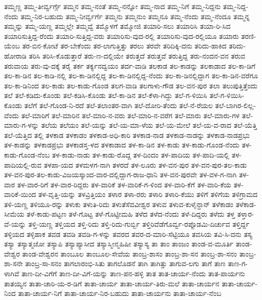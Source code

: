 ತಮ್ಮಣ್ಣ
ತಮ್ಮ-ತೀರ್ವ್ವರ್ಗ್ಗೆ
ತಮ್ಮನ
ತಮ್ಮ-ನಂತೆ
ತಮ್ಮ-ನನ್ನೋ
ತಮ್ಮ-ನಾದ
ತಮ್ಮ-ನಿಗೆ
ತಮ್ಮ-ನಿದ್ದನು
ತಮ್ಮ-ನಿದ್ದ-ನೆಂದು
ತಮ್ಮ-ನಿರ-ಬಹುದು
ತಮ್ಮ-ನೀರ್ವ್ವರ್ಗೆ
ತಮ್ಮನು
ತಮ್ಮನುಂ
ತಮ್ಮನೂ
ತಮ್ಮ-ನೆಂದು
ತಮ್ಮ-ನೆಂದೂ
ತಮ್ಮನ್ನ
ತಮ್ಮನ್ನು
ತಮ್ಮ-ಯಣ್ಣ
ತಮ್ಮಲ್ಲೇ
ತಮ್ಮವ್ವೆ
ತಮ್ಮೊಳಗೆ
ತಮ್ಮೋಜಿ
ತಯಾರಿ-ಸಲು
ತಯಾರಿಸಿ
ತಯಾ-ರಿ-ಸಿದ
ತಯಾರಿಸುತ್ತಿದ್ದ-ರೆಂದು
ತಯಾರಿ-ಸುತ್ತಿದ್ದ-ವರು
ತಯಾರಿಸು-ವುದ-ರಲ್ಲಿ
ತಯಾರಿಸು-ವುದ-ರಲ್ಲಿಯೂ
ತಯಾರು
ತರಣಿ-ಯೆಂಬ
ತರ-ಬಿನ-ಕೋಟೆ
ತರ-ಬೇಕೆಂದು
ತರ-ಲಾಗುತ್ತಿತ್ತು
ತರಲು
ತರವೇ
ತರಿದಿಕ್ಕಿ-ದನು
ತರಿದು-ಹಾಕಿದ
ತರಿದು-ಹೋರಾಡಿ
ತರಿಸಿ
ತರಿಸಿ-ಕೊಡುತ್ತಾರೆ
ತರು-ಣ-ದಲ್ಲಿಯೇ
ತರುತ್ತದೆ
ತರುತ್ತವೆ
ತರುತ್ತಿದ್ದ
ತರು-ನಂದನ-ವನ
ತರುವ
ತರುವಾಯ
ತರು-ವು-ದಕ್ಕೆ
ತರೈ
ತರ್ಕ
ತರ್ಕ್ಯನದ್ವಯಂ
ತರ್ದ-ವಾಡಿ
ತಲಕಾಡ
ತಲ-ಕಾಡನ್ನು
ತಲಕಾಡಾದ
ತಲ-ಕಾ-ಡಿಗೆ
ತಲ-ಕಾ-ಡಿನ
ತಲ-ಕಾಡಿ-ನಲ್ಲಿ
ತಲ-ಕಾ-ಡಿನಲ್ಲಿದ್ದ
ತಲ-ಕಾ-ಡಿನಲ್ಲಿದ್ದ-ನೆಂದು
ತಲ-ಕಾ-ಡಿನಲ್ಲಿದ್ದಾಗ
ತಲ-ಕಾ-ಡಿನ-ವರೆಗೂ
ತಲ-ಕಾ-ಡಿನಿಂದ
ತಲ-ಕಾಡು
ತಲ-ಕಾಡು-ಗೊಂಡ
ತಲಗ-ವಾಡಿ
ತಲಗಾಳು-ಗೌಡ
ತಲ-ವನ-ಪುರ
ತಲಾ
ತಲುಪುತ್ತಿತ್ತೆಂದು
ತಲೆ
ತಲೆ-ಕಡಿದು-ಕೊಂಡು
ತಲೆ-ಕಡಿಸಿ-ಕೊಂಡು
ತಲೆ-ಕಾ-ಡಿನ
ತಲೆ-ಕೆಳಾ-ಗಿದ್ದು
ತಲೆ-ಗ-ಳಿಯಿಸಿ
ತಲೆ-ಗ-ಳಿಯಿಸಿ-ಕೊಂಡು
ತಲೆಗೆ
ತಲೆ-ಗೊಂಡ-ನಿ-ರದೆ
ತಲೆ-ತಲಾಂತರ-ವಾಗಿ
ತಲೆ-ದೋರಿ-ತೆಂದು
ತಲೆ-ನೆ-ರೆಯಲ
ತಲೆ-ಬಾಗಿರ-ಲಿಲ್ಲ-ವೆಂದು
ತಲೆ-ಮಾರಿಗೆ
ತಲೆ-ಮಾರಿನ
ತಲೆ-ಮಾರಿ-ನ-ವರು
ತಲೆ-ಮಾರಿ-ನ-ವರೆಗ
ತಲೆ-ಮಾರು
ತಲೆ-ಮಾರು-ಗಳ
ತಲೆ-ಮಾರು-ಗ-ಳನ್ನು
ತಲೆಯ
ತಲೆಯಂ
ತಲೆ-ಯನ್ನು
ತಲೆ-ಯ-ಮಾ-ಳೆಯ
ತಲೆ-ಯ-ಮೇಲೆ
ತಲೆ-ಯ-ವ-ರಾದ
ತಲೆ-ಯೆತ್ತಿ
ತಲೆ-ಯೆತ್ತಿದ
ತಲ್ಲಿ
ತಳಕಾಡ
ತಳಕಾಡಂ
ತಳಕಾಡ-ಅಧಿ-ಕಾರಿ
ತಳಕಾಡ-ನಾಡ
ತಳಕಾಡ-ನಾಡನ್ನು
ತಳಕಾಡ-ನಾಡಪ್ರಭು
ತಳ-ಕಾಡನ್ನು
ತಳಕಾಡಪ್ರಭು
ತಳಕಾಡಸ್ತ-ಳದ
ತಳಕಾಡಾದ
ತಳ-ಕಾ-ಡಿನ
ತಳ-ಕಾಡು
ತಳ-ಕಾಡು-ಗೊಂಡ-ನೆಂದು
ತಳ-ಕಾಡು-ಗೊಂಡ-ನೆಂಬ
ತಳ-ಕಾಡು-ನಾಡು
ತಳ-ಕಾಡು-ರೊದ್ದ
ತಳ-ದಿಂದಂ
ತಳ-ಪಾದಿಯ
ತಳ-ಪಾದಿ-ಯಲ್ಲಿ
ತಳ-ಪಾದಿಯಲ್ಲಿ-ರುವ
ತಳಪಾ-ಯದ
ತಳಮಳಗ-ನಾಗಿ
ತಳರದೆ
ತಳ-ಲೂರು
ತಳ-ವನ-ಪುರ
ತಳ-ವನ-ಪುರ-ತಲ-ಕಾಡು
ತಳ-ವನ-ಪುರ-ತಲ-ಕಾಡು-ವಿಜಯಸ್ಕಾಂದ-ವಾರ-ದಲ್ಲಿದ್ದಾಗ-ರಾಜ-ಧಾನಿ
ತಳ-ವನ-ಪುರವೇ
ತಳ-ವಳ-ಗ-ನಾಗಿ
ತಳ-ವಾರ
ತಳ-ವಾರ-ರಿಗೆ
ತಳ-ವಾರ-ರಿದ್ದರು
ತಳ-ವಾರಿಕೆ
ತಳ-ವಾರಿಕೆ-ಗ-ಳಿಂದ
ತಳ-ವಾರಿ-ಕೆಗೆ
ತಳ-ವಾರಿ-ಕೆಯ
ತಳ-ವಾರಿಕೆ-ಯಿಂದ
ತಳ-ವೃತ್ತಿ-ಯನ್ನು
ತಳವ್ರಿತ್ತಿಯಂ
ತಳಾರ
ತಳಾ-ರರು
ತಳಾರಿ
ತಳಾರಿ-ಕೆಯು
ತಳಿಗೆ
ತಳಿಗೆಯ
ತಳಿಗ್ರಾಮದ
ತಳಿ-ಯಣ್ಣ
ತಳಿಯೂ-ರನ್ನು
ತಳುಕು
ತಳುತಿ-ರಿದು
ತಳುತೆಸೆವವೀಶ್ವರ
ತಳುವ
ತಳುವ-ಕುಳೈನ್ದಾನ್
ತಳೆಕಾಡಂ
ತಳೆಕಾಡ-ಸೀಮೆಯ
ತಳೆ-ಕಾಡು-ಪಟ್ಟಣ
ತಳೆ-ಗೊಟ್ಟ
ತಳೆ-ಗೊಟ್ಟೀಮಹಿ
ತಳೆದ
ತಳೆದ-ನೆಂದು
ತಳೆ-ದಿದ್ದರು
ತಳೆದು
ತಳ್ತ
ತಳ್ತಾರ-ವೆ-ಯನ್ನು
ತಳ್ತಿ-ಯಣ್ಣ
ತಳ್ತಿಯದ
ತಳ್ತಿ-ರಿದು
ತಳ್ತಿ-ರಿದು-ಗುರ್ಬ್ಬಿ
ತಳ್ತಿರಿವೆಡೆಗೊರ್ವ್ವ-ರಪ್ಪೊಡಮಿ-ದಿರ್ಚುವ
ತಳ್ತಿರ್ದ್ದ
ತಳ್ಳಿಯದ
ತಳ್ಳಿಹಾಕ
ತವಡ
ತವಡಿ
ತವಡಿ-ಗ-ಳನ್ನು
ತವರದ
ತವರ-ದ-ಮಾರಿ-ಸೆಟ್ಟಿಯೂ
ತವಸಿಯ
ತವಿ-ಸಿ-ದನು
ತಸ್ಯ
ತಸ್ಯಾ
ತಸ್ಯಾತ್ಮಜೋ
ತಸ್ಯಾಪಿ
ತಸ್ಯಾಪ್ಯಾಸೀದ
ತಸ್ಯಾಸ್ಮೀನ್ಮಹಿಷೀ
ತಸ್ಯಾಸ್ಯ
ತಾ
ತಾಂ
ತಾಂಜಂ
ತಾಂಡ-ವ-ಮೂರ್ತಿ
ತಾಂಡ-ವೇಶ್ವರ
ತಾಂಡ-ವೇಶ್ವರನ
ತಾಂಬೂಲ
ತಾಂಬೂಲ-ಸೇವೆಯ
ತಾಂಬ್ರ-ಶಾಸಂ
ತಾಂಬ್ರ-ಶಾ-ಸನ
ತಾಂಬ್ರ-ಶಾ-ಸನಂ
ತಾಂಬ್ರ-ಶಾ-ಸನೇ
ತಾಂಬ್ರ-ಸಾ-ಸನಂ
ತಾಗಲಾರಂಭಿ-ಸಿತು
ತಾಗಲೊಡನೆ
ತಾಗಿ
ತಾಗಿತ್ತು
ತಾಗುವ-ಲಗು
ತಾಗೆ
ತಾಣ
ತಾಣ-ಗ-ಳಾಗಿವೆ
ತಾಣ-ದೀ-ವಿಗೆಗೆ
ತಾಣ-ದೀ-ವಿಗೆ-ಯನ್ನು
ತಾಣ-ಪನ-ಹಳ್ಳಿ
ತಾತ
ತಾತ-ಚಾರ್ಯ-ನೆಂದು
ತಾತ-ಪಾರ್ಯನು
ತಾತಯ್ಯನ
ತಾತಾ-ಚಾರಿ-ಯ-ರ-ಡಿಗೆ
ತಾತಾ-ಚಾರ್ಯ
ತಾತಾ-ಚಾರ್ಯ-ತಿರು-ಮಲೆ
ತಾತಾ-ಚಾರ್ಯನ
ತಾತಾ-ಚಾರ್ಯ-ನಿಂದ
ತಾತಾ-ಚಾರ್ಯ-ನಿಗೆ
ತಾತಾ-ಚಾರ್ಯ-ನಿರ-ಬಹುದು
ತಾತಾ-ಚಾರ್ಯನು
ತಾತಾ-ಚಾರ್ಯ-ನೆಂಬ
